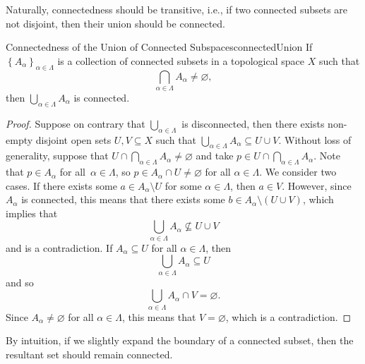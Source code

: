 \documentclass[math]{amznotes}
\theoremstyle{remark}
\begin{document}
Naturally, connectedness should be transitive, i.e., if two connected subsets are not disjoint, then their union should be connected. 
\begin{probox}{Connectedness of the Union of Connected Subspaces}{connectedUnion}
    If $\left\{A_{\alpha}\right\}_{\alpha \in \Lambda}$ is a collection of connected subsets in a topological space $X$ such that 
    \begin{equation*}
        \bigcap_{\alpha \in \Lambda}A_{\alpha} \neq \varnothing,
    \end{equation*}
    then $\bigcup_{\alpha \in \Lambda}A_{\alpha}$ is connected.
    \tcblower
    \begin{proof}
        Suppose on contrary that $\bigcup_{\alpha \in \Lambda}$ is disconnected, then there exists non-empty disjoint open sets $U, V \subseteq X$ such that $\bigcup_{\alpha \in \Lambda}A_{\alpha} \subseteq U \cup V$. Without loss of generality, suppose that $U \cap \bigcap_{\alpha \in \Lambda}A_{\alpha} \neq \varnothing$ and take $p \in U \cap \bigcap_{\alpha \in \Lambda}A_{\alpha}$. Note that $p \in A_{\alpha}$ for all~$\alpha \in \Lambda$, so $p \in A_{\alpha} \cap U \neq \varnothing$ for all $\alpha \in \Lambda$. We consider two cases. If there exists some $a \in A_{\alpha} \setminus U$ for some $\alpha \in \Lambda$, then $a \in V$. However, since $A_{\alpha}$ is connected, this means that there exists some $b \in A_{\alpha} \setminus \left(U \cup V\right)$, which implies that 
        \begin{equation*}
            \bigcup_{\alpha \in \Lambda}A_{\alpha} \not\subseteq U \cup V
        \end{equation*}
        and is a contradiction. If $A_{\alpha} \subseteq U$ for all $\alpha \in \Lambda$, then \begin{equation*}
            \bigcup_{\alpha \in \Lambda}A_{\alpha} \subseteq U
        \end{equation*}
        and so 
        \begin{equation*}
            \bigcup_{\alpha \in \Lambda}A_{\alpha} \cap V = \varnothing.
        \end{equation*}
        Since $A_{\alpha} \neq \varnothing$ for all $\alpha \in \Lambda$, this means that $V = \varnothing$, which is a contradiction.
    \end{proof}
\end{probox}
By intuition, if we slightly expand the boundary of a connected subset, then the resultant set should remain connected. 
\end{document}

